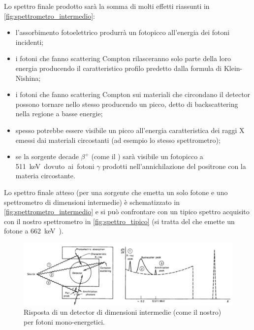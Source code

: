  Lo spettro finale prodotto sarà la somma di molti effetti riassunti in \autoref{fig:spettrometro_intermedio}:
 \begin{itemize}
 	\item l'assorbimento fotoelettrico produrrà un fotopicco all'energia dei fotoni incidenti;
 	\item i fotoni che fanno scattering Compton rilasceranno solo parte della loro energia producendo il caratteristico profilo predetto dalla  formula di Klein-Nishina;
 	\item i fotoni che fanno scattering Compton sui materiali che circondano il detector possono tornare nello stesso producendo un picco, detto di backscattering nella regione a basse energie;
 	\item spesso potrebbe essere visibile un picco all'energia caratteristica dei raggi X emessi dai materiali circostanti (ad esempio lo stesso spettrometro);
 	\item se la sorgente decade $\beta^+$ (come il \na) sarà visibile un fotopicco a \SI{511}keV dovuto ai fotoni $\gamma$ prodotti nell'annichilazione del positrone con la materia circostante.
 \end{itemize}
Lo spettro finale atteso (per una sorgente che emetta un solo fotone e uno spettrometro di dimensioni intermedie) è schematizzato in \autoref{fig:spettrometro_intermedio} e si può confrontare con un tipico spettro acquisito con il nostro spettrometro in \autoref{fig:spettro_tipico} (si tratta del \cs\; che emette un fotone a \SI{662}keV).

 \begin{figure}[h]
	\centering
	\includegraphics[width=\textwidth]{spettrometro_intermedio}
	\caption{\label{fig:spettrometro_intermedio}Risposta di un detector di dimensioni intermedie (come il nostro) per fotoni mono-energetici.}
 \end{figure}

